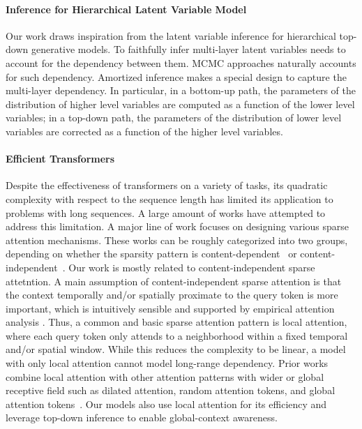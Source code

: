 \documentclass{article} \usepackage{iclr2022_conference,times}
\begin{document}
\paragraph{Inference for Hierarchical Latent Variable Model}
Our work draws inspiration from the latent variable inference for hierarchical top-down generative models. To faithfully infer multi-layer latent variables needs to account for the dependency between them. MCMC approaches \cite{nijkamp2020learning} naturally accounts for such dependency. Amortized inference \cite{sonderby2016ladder, maaloe2019biva, child2020very} makes a special design to capture the multi-layer dependency. In particular, in a bottom-up path, the parameters of the distribution of higher level variables are computed as a function of the lower level variables; in a top-down path, the parameters of the distribution of lower level variables are corrected as a function of the higher level variables.  



\paragraph{Efficient Transformers}
Despite the effectiveness of transformers on a variety of tasks, its quadratic complexity with respect to the sequence length has limited its application to problems with long sequences. A large amount of works have attempted to address this limitation. A major line of work focuses on designing various sparse attention mechanisms. These works can be roughly categorized into two groups, depending on whether the sparsity pattern is content-dependent~\citep{kitaev2020reformer, roy-etal-2021-efficient, wang-etal-2021-cluster} or content-independent~\citep{Child2019GeneratingLS, beltagy2020longformer, ainslie-etal-2020-etc, zaheer2020big}. Our work is mostly related to content-independent sparse attetntion. A main assumption of content-independent sparse attention is that the context temporally and/or spatially proximate to the query token is more important, which is intuitively sensible and supported by empirical attention analysis \citep{Child2019GeneratingLS}. Thus, a common and basic sparse attention pattern is local attention, where each query token only attends to a neighborhood within a fixed temporal and/or spatial window. While this reduces the complexity to be linear, a model with only local attention cannot model long-range dependency. Prior works combine local attention with other attention patterns with wider or global receptive field such as dilated attention, random attention tokens, and global attention tokens~\citep{beltagy2020longformer, zaheer2020big}. Our models also use local attention for its efficiency and leverage top-down inference to enable global-context awareness. 
\end{document}
